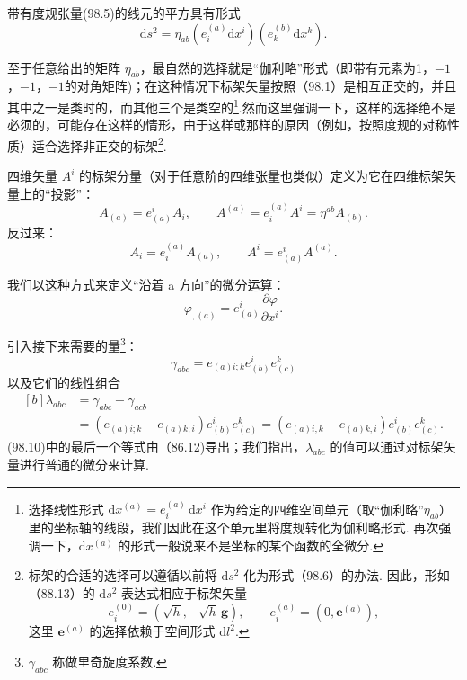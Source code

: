 带有度规张量(98.5)的线元的平方具有形式
\begin{equation}
  \mathrm{d}s^2=\eta_{ab}\left(e^{(a)}_i\mathrm{d}x^i\right)
  \left(e^{(b)}_k\mathrm{d}x^k\right).
\end{equation}

至于任意给出的矩阵 $\eta_{ab}$，最自然的选择就是“伽利略”形式（即带有元素为1，$-1$，$-1$，$-1$的对角矩阵)；在这种情况下标架矢量按照（98.1）是相互正交的，并且其中之一是类时的，而其他三个是类空的\footnote{选择线性形式 $\mathrm{d}x^{(a)}=e^{(a)}_i\,\mathrm{d}x^i$ 作为给定的四维空间单元（取“伽利略”$\eta_{ab}$）里的坐标轴的线段，我们因此在这个单元里将度规转化为伽利略形式. 再次强调一下，$\mathrm{d}x^{(a)}$ 的形式一般说来不是坐标的某个函数的全微分.}.然而这里强调一下，这样的选择绝不是必须的，可能存在这样的情形，由于这样或那样的原因（例如，按照度规的对称性质）适合选择非正交的标架\footnote{标架的合适的选择可以遵循以前将 $\mathrm{d}s^2$ 化为形式（98.6）的办法. 因此，形如（88.13）的 $\mathrm{d}s^2$ 表达式相应于标架矢量
\begin{equation*}
  e^{(0)}_i=(\sqrt{h},-\sqrt{h}\,\boldsymbol{g}),\qquad
  e^{(a)}_i=(0,\boldsymbol{e}^{(a)}),
\end{equation*}
这里 $\boldsymbol{e}^{(a)}$ 的选择依赖于空间形式 $\mathrm{d}l^2$.}.

四维矢量 $A^i$ 的标架分量（对于任意阶的四维张量也类似）定义为它在四维标架矢量上的“投影”：
\begin{equation}
  A_{(a)}=e^i_{(a)}A_i,\qquad
  A^{(a)}=e^{(a)}_iA^i=\eta^{ab}A_{(b)}.
\end{equation}
反过来：
\begin{equation}
  A_i=e^{(a)}_iA_{(a)},\qquad
  A^i=e^i_{(a)}A^{(a)}.
\end{equation}

我们以这种方式来定义“沿着 a 方向”的微分运算：
\begin{equation*}
  \varphi_{,(a)}=e^i_{(a)}\frac{\partial\varphi}{\partial x^i}.
\end{equation*}

引入接下来需要的量\footnote{$\gamma_{abc}$ 称做里奇旋度系数.}：
\begin{equation}
  \gamma_{abc}=e_{(a)i;k}e^i_{(b)}e^k_{(c)}
\end{equation}
以及它们的线性组合
\begin{equation}
\begin{aligned}[b]
  \lambda_{abc}&=\gamma_{abc}-\gamma_{acb}\\
  &=\left(e_{(a)i;k}-e_{(a)k;i}\right)e^i_{(b)}e^k_{(c)}
  =\left(e_{(a)i,k}-e_{(a)k,i}\right)e^i_{(b)}e^k_{(c)}.
\end{aligned}
\end{equation}
(98.10)中的最后一个等式由（86.12)导出；我们指出，$\lambda_{abc}$ 的值可以通过对标架矢量进行普通的微分来计算.

